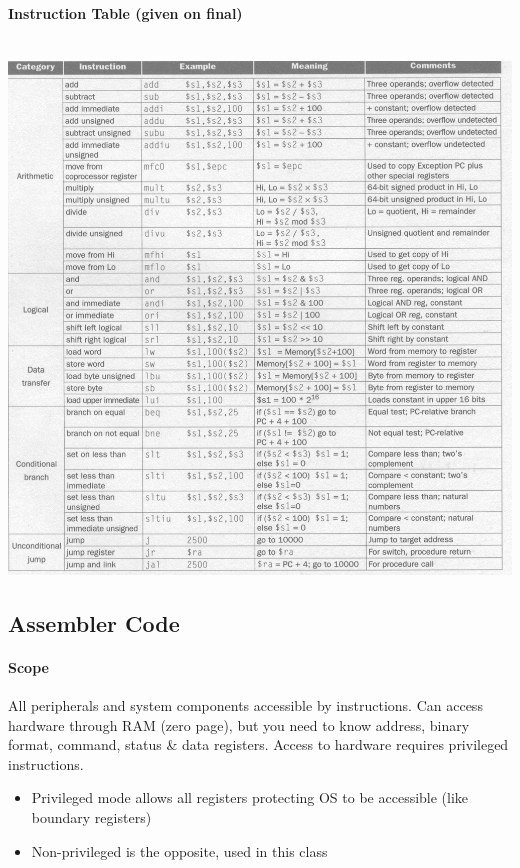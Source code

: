 \documentclass[12 pt]{article}
\begin{document}
	\paragraph{Instruction Table (given on final)}
	~\\ \includegraphics[scale=0.3]{instr}
	\subsection{Assembler Code}
	\paragraph{Scope} All peripherals and system components accessible by instructions. Can access hardware through RAM (zero page), but you need to know address, binary format, command, status \& data registers. Access to hardware requires privileged instructions.
	\begin{itemize}
	\item Privileged mode allows all registers protecting OS to be accessible (like boundary registers)
	\item Non-privileged is the opposite, used in this class
\end{itemize}
\end{document}
